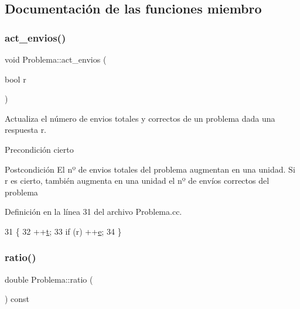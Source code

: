\subsection{Documentación de las funciones miembro}
\mbox{\label{class_problema_a7867d1ae1e09f424283feae8c5b636c8}} 
\subsubsection{\texorpdfstring{act\+\_\+envios()}{act\_envios()}}
{\footnotesize\ttfamily void Problema\+::act\+\_\+envios (\begin{DoxyParamCaption}\item[{bool}]{r }\end{DoxyParamCaption})}



Actualiza el número de envios totales y correctos de un problema dada una respuesta r. 

\begin{DoxyPrecond}{Precondición}
cierto 
\end{DoxyPrecond}
\begin{DoxyPostcond}{Postcondición}
El nº de envios totales del problema augmentan en una unidad. Si r es cierto, también augmenta en una unidad el nº de envíos correctos del problema 
\end{DoxyPostcond}


Definición en la línea 31 del archivo Problema.\+cc.


\begin{DoxyCode}
31                                       \{
32         ++\mbox{\hyperlink{class_problema_a968bd889d6dc627efb59318ccc2eed7d}{t}};
33         \textcolor{keywordflow}{if} (r) ++\mbox{\hyperlink{class_problema_a725a4c8c4faf4d1a646ef7ce9db37211}{e}};
34       \}
\end{DoxyCode}
\mbox{\label{class_problema_a8b41092b4207375e9f1bb4e29b9d4535}} 
\subsubsection{\texorpdfstring{ratio()}{ratio()}}
{\footnotesize\ttfamily double Problema\+::ratio (\begin{DoxyParamCaption}{ }\end{DoxyParamCaption}) const}



